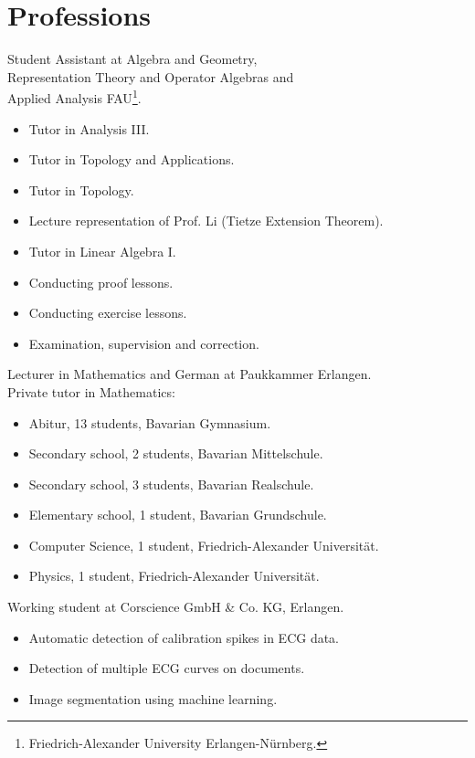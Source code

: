 \documentclass[a4paper, 11pt]{article}
\newcommand{\years}[1]{\marginnote{\scriptsize #1}}
\begin{document}
\section*{Professions}
\years{2023--25} Student Assistant at Algebra and Geometry, \\
Representation Theory and Operator Algebras and \\
Applied Analysis FAU\footnote{Friedrich-Alexander University Erlangen-Nürnberg.}.
\begin{itemize}
	\item Tutor in \glqq Analysis III\grqq.
	\item Tutor in \glqq Topology and Applications\grqq.
	\item Tutor in \glqq Topology\grqq.
	\item Lecture representation of Prof. Li (Tietze Extension Theorem).
	\item Tutor in \glqq Linear Algebra I\grqq.
	\item Conducting proof lessons.
	\item Conducting exercise lessons.
	\item Examination, supervision and correction.
\end{itemize}
\years{2025} Lecturer in Mathematics and German at Paukkammer Erlangen.\\
\years{2024--25} Private tutor in Mathematics:
\begin{itemize}
	\item Abitur, 13 students, Bavarian Gymnasium.
	\item Secondary school, 2 students, Bavarian Mittelschule.
	\item Secondary school, 3 students, Bavarian Realschule.
	\item Elementary school, 1 student, Bavarian Grundschule.
	\item Computer Science, 1 student, Friedrich-Alexander Universität. 
	\item Physics, 1 student, Friedrich-Alexander Universität. 
\end{itemize}
\years{2021--22} Working student at Corscience GmbH \& Co. KG, Erlangen.
\begin{itemize}
	\item Automatic detection of calibration spikes in ECG data.
	\item Detection of multiple ECG curves on documents.
	\item Image segmentation using machine learning.
\end{itemize}
\end{document}
